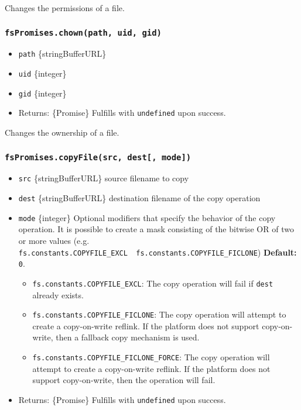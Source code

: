 Changes the permissions of a file.

\subsubsection{\texorpdfstring{\texttt{fsPromises.chown(path,\ uid,\ gid)}}{fsPromises.chown(path, uid, gid)}}\label{fspromises.chownpath-uid-gid}

\begin{itemize}
\tightlist
\item
  \texttt{path} \{string\textbar Buffer\textbar URL\}
\item
  \texttt{uid} \{integer\}
\item
  \texttt{gid} \{integer\}
\item
  Returns: \{Promise\} Fulfills with \texttt{undefined} upon success.
\end{itemize}

Changes the ownership of a file.

\subsubsection{\texorpdfstring{\texttt{fsPromises.copyFile(src,\ dest{[},\ mode{]})}}{fsPromises.copyFile(src, dest{[}, mode{]})}}\label{fspromises.copyfilesrc-dest-mode}

\begin{itemize}
\tightlist
\item
  \texttt{src} \{string\textbar Buffer\textbar URL\} source filename to
  copy
\item
  \texttt{dest} \{string\textbar Buffer\textbar URL\} destination
  filename of the copy operation
\item
  \texttt{mode} \{integer\} Optional modifiers that specify the behavior
  of the copy operation. It is possible to create a mask consisting of
  the bitwise OR of two or more values (e.g.
  \texttt{fs.constants.COPYFILE\_EXCL\ \textbar{}\ fs.constants.COPYFILE\_FICLONE})
  \textbf{Default:} \texttt{0}.

  \begin{itemize}
  \tightlist
  \item
    \texttt{fs.constants.COPYFILE\_EXCL}: The copy operation will fail
    if \texttt{dest} already exists.
  \item
    \texttt{fs.constants.COPYFILE\_FICLONE}: The copy operation will
    attempt to create a copy-on-write reflink. If the platform does not
    support copy-on-write, then a fallback copy mechanism is used.
  \item
    \texttt{fs.constants.COPYFILE\_FICLONE\_FORCE}: The copy operation
    will attempt to create a copy-on-write reflink. If the platform does
    not support copy-on-write, then the operation will fail.
  \end{itemize}
\item
  Returns: \{Promise\} Fulfills with \texttt{undefined} upon success.
\end{itemize}

